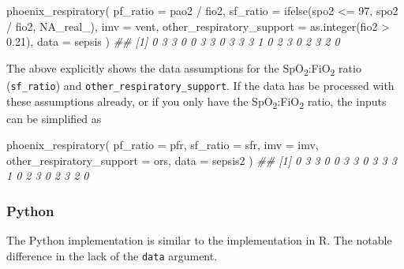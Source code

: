 \documentclass[
  letterpaper,
  DIV=11,
  numbers=noendperiod]{scrartcl}
\newenvironment{Shaded}{\begin{snugshade}}{\end{snugshade}}
\newcommand{\AttributeTok}[1]{\textcolor[rgb]{0.40,0.45,0.13}{#1}}
\newcommand{\ConstantTok}[1]{\textcolor[rgb]{0.56,0.35,0.01}{#1}}
\newcommand{\DecValTok}[1]{\textcolor[rgb]{0.68,0.00,0.00}{#1}}
\newcommand{\DocumentationTok}[1]{\textcolor[rgb]{0.37,0.37,0.37}{\textit{#1}}}
\newcommand{\FloatTok}[1]{\textcolor[rgb]{0.68,0.00,0.00}{#1}}
\newcommand{\FunctionTok}[1]{\textcolor[rgb]{0.28,0.35,0.67}{#1}}
\newcommand{\NormalTok}[1]{\textcolor[rgb]{0.00,0.23,0.31}{#1}}
\newcommand{\SpecialCharTok}[1]{\textcolor[rgb]{0.37,0.37,0.37}{#1}}
\begin{document}
\begin{Shaded}
\begin{Highlighting}[]
\FunctionTok{phoenix\_respiratory}\NormalTok{(}
  \AttributeTok{pf\_ratio =}\NormalTok{ pao2 }\SpecialCharTok{/}\NormalTok{ fio2,}
  \AttributeTok{sf\_ratio =} \FunctionTok{ifelse}\NormalTok{(spo2 }\SpecialCharTok{\textless{}=} \DecValTok{97}\NormalTok{, spo2 }\SpecialCharTok{/}\NormalTok{ fio2, }\ConstantTok{NA\_real\_}\NormalTok{),}
  \AttributeTok{imv =}\NormalTok{ vent,}
  \AttributeTok{other\_respiratory\_support =} \FunctionTok{as.integer}\NormalTok{(fio2 }\SpecialCharTok{\textgreater{}} \FloatTok{0.21}\NormalTok{),}
  \AttributeTok{data =}\NormalTok{ sepsis}
\NormalTok{)}
\DocumentationTok{\#\#  [1] 0 3 3 0 0 3 3 0 3 3 3 1 0 2 3 0 2 3 2 0}
\end{Highlighting}
\end{Shaded}

The above explicitly shows the data assumptions for the
SpO\textsubscript{2}:FiO\textsubscript{2} ratio (\texttt{sf\_ratio}) and
\texttt{other\_respiratory\_support}. If the data has be processed with
these assumptions already, or if you only have the
SpO\textsubscript{2}:FiO\textsubscript{2} ratio, the inputs can be
simplified as

\begin{Shaded}
\begin{Highlighting}[]
\FunctionTok{phoenix\_respiratory}\NormalTok{(}
  \AttributeTok{pf\_ratio =}\NormalTok{ pfr,}
  \AttributeTok{sf\_ratio =}\NormalTok{ sfr,}
  \AttributeTok{imv =}\NormalTok{ imv,}
  \AttributeTok{other\_respiratory\_support =}\NormalTok{ ors,}
  \AttributeTok{data =}\NormalTok{ sepsis2}
\NormalTok{)}
\DocumentationTok{\#\#  [1] 0 3 3 0 0 3 3 0 3 3 3 1 0 2 3 0 2 3 2 0}
\end{Highlighting}
\end{Shaded}

\subsubsection{Python}\label{python-2}

The Python implementation is similar to the implementation in R. The
notable difference in the lack of the \texttt{data} argument.
\end{document}
